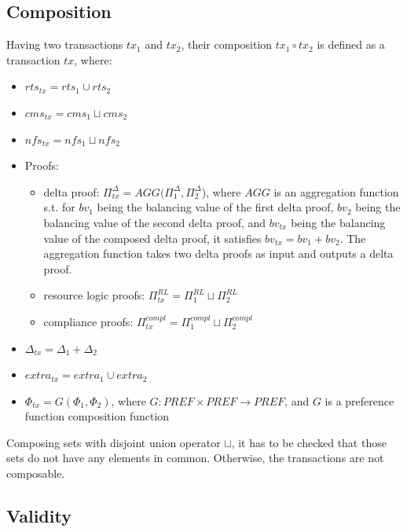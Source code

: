 \documentclass[
    11pt,            %
    techreport,        %
    affiltop,       %
]{art}
\begin{document}
\subsection{Composition}\label{tx-composition}

Having two transactions $tx_1$ and $tx_2$, their composition $tx_1 \circ tx_2$ is defined as a transaction $tx$, where:
\begin{itemize}
    \item $rts_{tx} = rts_1 \cup rts_2$
    \item $cms_{tx} = cms_1 \sqcup cms_2$
    \item $nfs_{tx} = nfs_1 \sqcup nfs_2$
    \item Proofs:
    \begin{itemize}
        \item delta proof: $\Pi^{\Delta}_{tx} = AGG(\Pi^{\Delta}_1, \Pi^{\Delta}_2$), where $AGG$ is an aggregation function s.t. for $bv_1$ being the balancing value of the first delta proof, $bv_2$ being the balancing value of the second delta proof, and $bv_{tx}$ being the balancing value of the composed delta proof, it satisfies $bv_{tx} = bv_1 + bv_2$. The aggregation function takes two delta proofs as input and outputs a delta proof.
        \item resource logic proofs: $\Pi^{RL}_{tx} = \Pi^{RL}_1 \sqcup \Pi^{RL}_2$
        \item compliance proofs: $\Pi^{compl}_{tx} = \Pi^{compl}_1 \sqcup \Pi^{compl}_2$
    \end{itemize}
    \item $\Delta_{tx} = \Delta_1 + \Delta_2$
    \item $extra_{tx} = extra_1 \cup extra_2$
    \item $\Phi_{tx} = G(\Phi_1, \Phi_2)$, where $G: PREF \times PREF \rightarrow PREF$, and $G$ is a preference function composition function
\end{itemize}

\begin{remark}
    Composing sets with disjoint union operator $\sqcup$, it has to be checked that those sets do not have any elements in common. Otherwise, the transactions are not composable.
\end{remark}


\subsection{Validity}\label{tx-validity}
\end{document}

